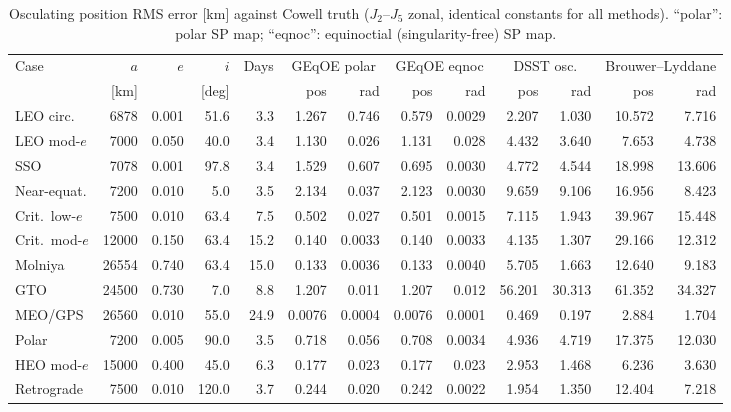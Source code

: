 \begin{table}[ht]
\centering
\caption{Osculating position RMS error [km] against Cowell truth
($J_2$--$J_5$ zonal, identical constants for all methods).
``polar'': polar SP map; ``eqnoc'': equinoctial (singularity-free) SP map.}
\label{tab:dsst_osculating}
\small
\begin{tabular}{@{}lrrrrrrrrrrrr@{}}
\toprule
Case & $a$ & $e$ & $i$ & Days & \multicolumn{2}{c}{GEqOE polar} & \multicolumn{2}{c}{GEqOE eqnoc} & \multicolumn{2}{c}{DSST osc.} & \multicolumn{2}{c}{Brouwer--Lyddane} \\
 & [km] & & [deg] &  & pos & rad & pos & rad & pos & rad & pos & rad \\
\midrule
LEO circ. & 6878 & 0.001 & 51.6 & 3.3 & 1.267 & 0.746 & 0.579 & 0.0029 & 2.207 & 1.030 & 10.572 & 7.716 \\
LEO mod-$e$ & 7000 & 0.050 & 40.0 & 3.4 & 1.130 & 0.026 & 1.131 & 0.028 & 4.432 & 3.640 & 7.653 & 4.738 \\
SSO & 7078 & 0.001 & 97.8 & 3.4 & 1.529 & 0.607 & 0.695 & 0.0030 & 4.772 & 4.544 & 18.998 & 13.606 \\
Near-equat. & 7200 & 0.010 & 5.0 & 3.5 & 2.134 & 0.037 & 2.123 & 0.0030 & 9.659 & 9.106 & 16.956 & 8.423 \\
Crit.\ low-$e$ & 7500 & 0.010 & 63.4 & 7.5 & 0.502 & 0.027 & 0.501 & 0.0015 & 7.115 & 1.943 & 39.967 & 15.448 \\
Crit.\ mod-$e$ & 12000 & 0.150 & 63.4 & 15.2 & 0.140 & 0.0033 & 0.140 & 0.0033 & 4.135 & 1.307 & 29.166 & 12.312 \\
Molniya & 26554 & 0.740 & 63.4 & 15.0 & 0.133 & 0.0036 & 0.133 & 0.0040 & 5.705 & 1.663 & 12.640 & 9.183 \\
GTO & 24500 & 0.730 & 7.0 & 8.8 & 1.207 & 0.011 & 1.207 & 0.012 & 56.201 & 30.313 & 61.352 & 34.327 \\
MEO/GPS & 26560 & 0.010 & 55.0 & 24.9 & 0.0076 & 0.0004 & 0.0076 & 0.0001 & 0.469 & 0.197 & 2.884 & 1.704 \\
Polar & 7200 & 0.005 & 90.0 & 3.5 & 0.718 & 0.056 & 0.708 & 0.0034 & 4.936 & 4.719 & 17.375 & 12.030 \\
HEO mod-$e$ & 15000 & 0.400 & 45.0 & 6.3 & 0.177 & 0.023 & 0.177 & 0.023 & 2.953 & 1.468 & 6.236 & 3.630 \\
Retrograde & 7500 & 0.010 & 120.0 & 3.7 & 0.244 & 0.020 & 0.242 & 0.0022 & 1.954 & 1.350 & 12.404 & 7.218 \\
\bottomrule
\end{tabular}
\end{table}